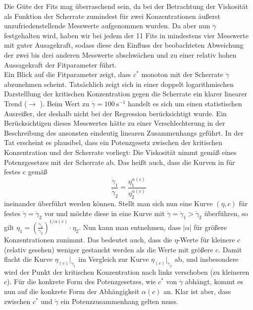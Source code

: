 \documentclass[11pt,a4paper,oneside]{scrartcl}
\begin{document}
Die Güte der Fits mag überraschend sein, da bei der Betrachtung der Viskosität als Funktion der Scherrate zumindest für zwei Konzentrationen äußerst unzufriedenstellende Messwerte aufgenommen wurden. Da aber nun $\dot\gamma$ festgehalten wird, haben wir bei jedem der 11 Fits in  mindestens vier Messwerte mit guter Ausagekraft, sodass diese den Einfluss der beobachteten Abweichung der zwei bis drei anderen Messwerte abschwächen und zu einer relativ hohen Aussagekraft der Fitparameter führt.\\
Ein Blick auf die Fitparameter zeigt, dass $c^*$ monoton mit der Scherrate $\dot\gamma$ abzunehmen scheint. Tatsächlich zeigt sich in einer doppelt logarithmischen Darstelllung der kritischen Konzentration gegen die Scherrate ein klarer linearer Trend ($\rightarrow$ ). Beim Wert zu $\dot\gamma=100\ \mathrm s^{-1}$ handelt es sich um einen statistischen Ausreißer, der deshalb nicht bei der Regression berücksichtigt wurde. Ein Berücksichtigen dieses Messwertes hätte zu einer Verschlechterung in der Beschreibung des ansonsten eindeutig linearen Zusammenhangs geführt.
In der Tat erscheint es plausibel, dass ein Potenzgesetz zwischen der kritischen Konzentration und der Scherrate vorliegt: Die Viskosität nimmt gemäß eines Potenzgesetzes mit der Scherrate ab. 
Das heißt auch, dass die Kurven in  für festes c gemäß \begin{equation}
\frac{\dot\gamma_1}{\dot\gamma_2}=\frac{\eta_1^{\alpha(c)}}{\eta_2^{\alpha(c)}}
\end{equation}
ineinander überführt werden können. Stellt man sich nun eine Kurve $(\eta,c)$ für festes $\dot\gamma=\dot\gamma_2$ vor und möchte diese in eine Kurve mit $\dot\gamma=\dot\gamma_1>\dot\gamma_2$ überführen, so gilt $\eta_1=\left(\frac{\dot\gamma_1}{\dot\gamma_2}\right)^{1/\alpha(c)}\cdot\eta_2$. Nun kann man  entnehmen, dass $|\alpha|$ für größere Konzentrationen zunimmt. Das bedeutet auch, dass die $\eta$-Werte für kleinere $c$ (relativ gesehen) weniger gestaucht werden als die Werte mit größere $c$. Damit flacht die Kurve $\eta_(c)\big|_{\dot\gamma_1}$ im Vergleich zur Kurve 
$\eta_(c)\big|_{\dot\gamma_2}$ ab, und insbesondere wird der Punkt der kritischen Konzentration nach links verschoben (zu kleineren $c$). Für die konkrete Form des Potenzgesetzes, wie $c^*$ von $\dot\gamma$ abhängt, kommt es nun auf die konkrete Form der Abhängigkeit $\alpha(c)$ an. Klar ist aber, dass zwischen $c^*$ und $\dot\gamma$ ein Potenzzusammenhang gelten muss.\par
\end{document}
